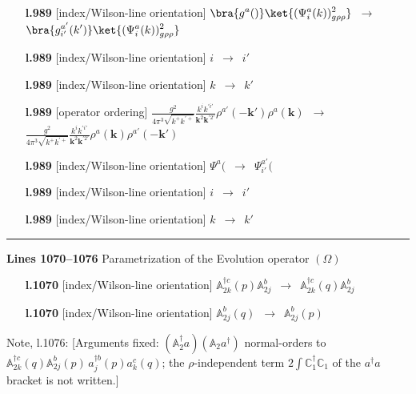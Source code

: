 \documentclass[10pt]{article}
\newenvironment{notebox}{\def\FrameCommand{{\color{notebar}\vrule width 1.5pt}\hspace{6pt}}\MakeFramed{\advance\hsize-\width\FrameRestore}\small}{\endMakeFramed}
\def\mf#1{\mathbb{#1}}
\def\v#1{\mathbf{#1}}
\begin{document}
\begin{itemize}[leftmargin=2.2em,itemsep=1pt,topsep=2pt]
\item[\textbf{l.989}] \textsf{\small [index/Wilson-line orientation]} $\displaystyle \bra{g^{a}_{}()}\ket{(\Psi^{a}_{i}(k))^{2}_{g\rho\rho} }$\ $\longrightarrow$\ $\displaystyle \bra{g^{a'}_{i'}(k')}\ket{(\Psi^{a}_{i}(k))^{2}_{g\rho\rho} }$
\item[\textbf{l.989}] \textsf{\small [index/Wilson-line orientation]} $\displaystyle i$\ $\longrightarrow$\ $\displaystyle i'$
\item[\textbf{l.989}] \textsf{\small [index/Wilson-line orientation]} $\displaystyle k$\ $\longrightarrow$\ $\displaystyle k'$
\item[\textbf{l.989}] \textsf{\small [operator ordering]} $\displaystyle \frac{g^2}{4 \pi^3 \sqrt{k^+ k^{'+}}} \frac{k^{i} k^{'i'}}{\v{k}^2\v{k}^{'2'}} \rho^{a'} (-\v{k}') \rho^a (\v{k})$\ $\longrightarrow$\ $\displaystyle \frac{g^2}{4 \pi^3 \sqrt{k^+ k^{'+}}} \frac{k^{i} k^{'i'}}{\v{k}^2\v{k}^{'2'}} \rho^a (\v{k})\rho^{a'} (-\v{k}')$
\item[\textbf{l.989}] \textsf{\small [index/Wilson-line orientation]} $\displaystyle \Psi^{a}_{}($\ $\longrightarrow$\ $\displaystyle \Psi^{a'}_{i'}($
\item[\textbf{l.989}] \textsf{\small [index/Wilson-line orientation]} $\displaystyle i$\ $\longrightarrow$\ $\displaystyle i'$
\item[\textbf{l.989}] \textsf{\small [index/Wilson-line orientation]} $\displaystyle k$\ $\longrightarrow$\ $\displaystyle k'$
\end{itemize}
\noindent\rule{\linewidth}{0.3pt}\par\noindent\textbf{Lines 1070--1076} \quad \textsf{Parametrization of the Evolution operator $(\Omega)$} \par
\begin{itemize}[leftmargin=2.2em,itemsep=1pt,topsep=2pt]
\item[\textbf{l.1070}] \textsf{\small [index/Wilson-line orientation]} $\displaystyle \mf{A}^{\dagger c}_{2k}(p)\mf{A}^{b}_{2j}$\ $\longrightarrow$\ $\displaystyle \mf{A}^{\dagger c}_{2k}(q)\mf{A}^{b}_{2j}$
\item[\textbf{l.1070}] \textsf{\small [index/Wilson-line orientation]} $\displaystyle \mf{A}^{b}_{2j}(q)$\ $\longrightarrow$\ $\displaystyle \mf{A}^{b}_{2j}(p)$
\end{itemize}
\begin{notebox}\textsf{\small Note, l.1076:} [Arguments fixed: $(\mf{A}_2^\dagger a)(\mf{A}_2 a^\dagger)$ normal-orders to $\mf{A}^{\dagger c}_{2k}(q)\mf{A}^{b}_{2j}(p)\,a^{\dagger b}_j(p)a^c_k(q)$; the $\rho$-independent term $2\int\mf{C}_1^\dagger\mf{C}_1$ of the $a^\dagger a$ bracket is not written.]\end{notebox}
\end{document}
